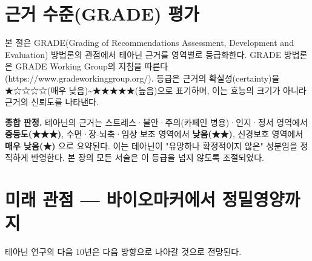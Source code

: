\documentclass[11pt,oneside]{book}
\begin{document}
\section{근거 수준(GRADE) 평가}
본 절은 GRADE(Grading of Recommendations Assessment, Development and Evaluation) 방법론의 관점에서 테아닌 근거를 영역별로 등급화한다. GRADE 방법론은 GRADE Working Group의 지침을 따른다(https://www.gradeworkinggroup.org/). 등급은 근거의 확실성(certainty)을 ★☆☆☆☆(매우 낮음)\textasciitilde{}★★★★★(높음)으로 표기하며, 이는 효능의 크기가 아니라 근거의 신뢰도를 나타낸다.

\vspace{2pt}\vspace{3pt}

\textbf{종합 판정.} 테아닌의 근거는 스트레스·불안·주의(카페인 병용)·인지·정서 영역에서 \textbf{중등도(★★★)}, 수면·장-뇌축·임상 보조 영역에서 \textbf{낮음(★★)}, 신경보호 영역에서 \textbf{매우 낮음(★)} 으로 요약된다. 이는 테아닌이 "유망하나 확정적이지 않은" 성분임을 정직하게 반영한다. 본 장의 모든 서술은 이 등급을 넘지 않도록 조절되었다.

\section{미래 관점 — 바이오마커에서 정밀영양까지}
테아닌 연구의 다음 10년은 다음 방향으로 나아갈 것으로 전망된다.
\end{document}
